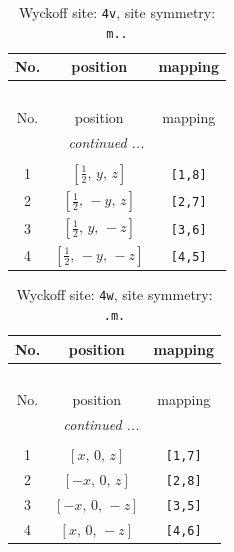 \documentclass[fleqn,8pt]{jsarticle}
\begin{document}
\begin{longtable}{ccc}
\caption{Wyckoff site: {\tt 4v}, site symmetry: {\tt m..}}
 \\
 \hline \hline
No. & position & mapping \\ \hline \endfirsthead

\multicolumn{2}{l}{\tablename\ \thetable{}} \\
 \hline \hline
No. & position & mapping \\ \hline \endhead

 \hline \hline
\multicolumn{2}{r}{\footnotesize\it continued ...} \\ \endfoot

 \hline \hline
\multicolumn{2}{r}{} \\ \endlastfoot

1 & $\left[ \frac{1}{2},\, y,\, z \right]$ & {\tt [1,8]} \\ \hline
2 & $\left[ \frac{1}{2},\, - y,\, z \right]$ & {\tt [2,7]} \\ \hline
3 & $\left[ \frac{1}{2},\, y,\, - z \right]$ & {\tt [3,6]} \\ \hline
4 & $\left[ \frac{1}{2},\, - y,\, - z \right]$ & {\tt [4,5]} \\
\end{longtable}
\renewcommand{\arraystretch}{1.2}
\begin{longtable}{ccc}
\caption{Wyckoff site: {\tt 4w}, site symmetry: {\tt .m.}}
 \\
 \hline \hline
No. & position & mapping \\ \hline \endfirsthead

\multicolumn{2}{l}{\tablename\ \thetable{}} \\
 \hline \hline
No. & position & mapping \\ \hline \endhead

 \hline \hline
\multicolumn{2}{r}{\footnotesize\it continued ...} \\ \endfoot

 \hline \hline
\multicolumn{2}{r}{} \\ \endlastfoot

1 & $\left[ x,\, 0,\, z \right]$ & {\tt [1,7]} \\ \hline
2 & $\left[ - x,\, 0,\, z \right]$ & {\tt [2,8]} \\ \hline
3 & $\left[ - x,\, 0,\, - z \right]$ & {\tt [3,5]} \\ \hline
4 & $\left[ x,\, 0,\, - z \right]$ & {\tt [4,6]} \\
\end{longtable}
\end{document}
